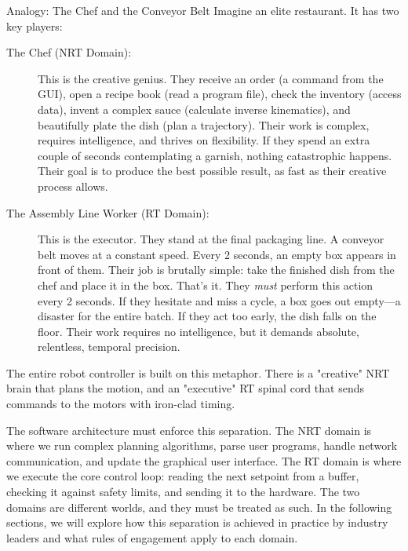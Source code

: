 \begin{tipbox}{Analogy: The Chef and the Conveyor Belt}
Imagine an elite restaurant. It has two key players:
\begin{description}
    \item[The Chef (NRT Domain):] This is the creative genius. They receive an order (a command from the GUI), open a recipe book (read a program file), check the inventory (access data), invent a complex sauce (calculate inverse kinematics), and beautifully plate the dish (plan a trajectory). Their work is complex, requires intelligence, and thrives on flexibility. If they spend an extra couple of seconds contemplating a garnish, nothing catastrophic happens. Their goal is to produce the best possible result, as fast as their creative process allows.
    
    \item[The Assembly Line Worker (RT Domain):] This is the executor. They stand at the final packaging line. A conveyor belt moves at a constant speed. Every 2 seconds, an empty box appears in front of them. Their job is brutally simple: take the finished dish from the chef and place it in the box. That's it. They \textit{must} perform this action every 2 seconds. If they hesitate and miss a cycle, a box goes out empty—a disaster for the entire batch. If they act too early, the dish falls on the floor. Their work requires no intelligence, but it demands absolute, relentless, temporal precision.
\end{description}
The entire robot controller is built on this metaphor. There is a "creative" NRT brain that plans the motion, and an "executive" RT spinal cord that sends commands to the motors with iron-clad timing.
\end{tipbox}

The software architecture must enforce this separation. The NRT domain is where we run complex planning algorithms, parse user programs, handle network communication, and update the graphical user interface. The RT domain is where we execute the core control loop: reading the next setpoint from a buffer, checking it against safety limits, and sending it to the hardware. The two domains are different worlds, and they must be treated as such. In the following sections, we will explore how this separation is achieved in practice by industry leaders and what rules of engagement apply to each domain.



